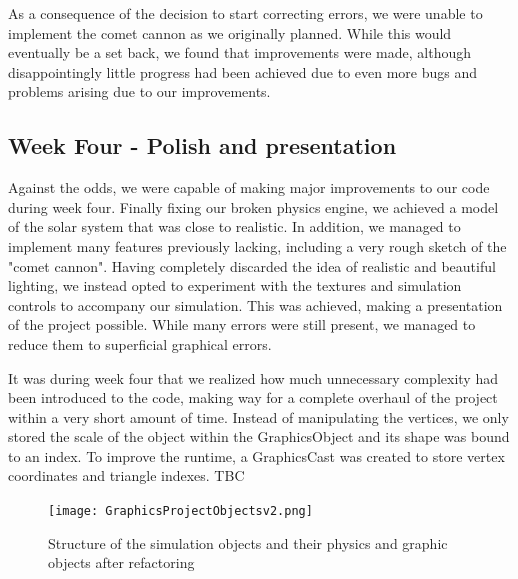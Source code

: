As a consequence of the decision to start correcting errors, we were unable to implement the comet cannon as we originally planned. While this would eventually be a set back, we found that improvements were made, although disappointingly little progress had been achieved due to even more bugs and problems arising due to our improvements.

\subsection{Week Four - Polish and presentation}
Against the odds, we were capable of making major improvements to our code during week four. Finally fixing our broken physics engine, we achieved a model of the solar system that was close to realistic. In addition, we managed to implement many features previously lacking, including a very rough sketch of the "comet cannon". Having completely discarded the idea of realistic and beautiful lighting, we instead opted to experiment with the textures and simulation controls to accompany our simulation. This was achieved, making a presentation of the project possible. While many errors were still present, we managed to reduce them to superficial graphical errors.

It was during week four that we realized how much unnecessary complexity had been introduced to the code, making way for a complete overhaul of the project within a very short amount of time. Instead of manipulating the vertices, we only stored the scale of the object within the GraphicsObject and its shape was bound to an index. To improve the runtime, a GraphicsCast was created to store vertex coordinates and triangle indexes. TBC

\begin{figure}[h]
\centering
\texttt{[image: GraphicsProjectObjectsv2.png]}
\label{GraphicsObjectsv2}
\caption{Structure of the simulation objects and their physics and graphic objects after refactoring}
\end{figure}